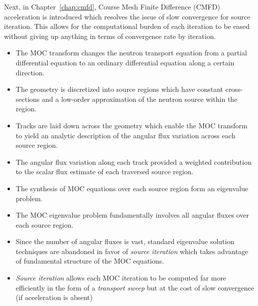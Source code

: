 Next, in Chapter~\ref{chap:cmfd}, Course Mesh Finite Difference (CMFD) acceleration is introduced which resolves the issue of slow convergence for source iteration. This allows for the computational burden of each iteration to be eased without giving up anything in terms of convergence rate by iteration.

\newpage
\vfill
\begin{highlightsbox}[frametitle=Highlights]
	\begin{itemize}
		\item The MOC transform changes the neutron transport equation from a partial differential equation to an ordinary differential equation along a certain direction.
		\item The geometry is discretized into source regions which have constant cross-sections and a low-order approximation of the neutron source within the region.
		\item Tracks are laid down across the geometry which enable the  MOC transform to yield an analytic description of the angular flux variation across each source region.
		\item The angular flux variation along each track provided a weighted contribution to the scalar flux estimate of each traversed source region.
		\item The synthesis of MOC equations over each source region form an eigenvalue problem.
		\item The MOC eigenvalue problem fundamentally involves all angular fluxes over each source region.
		\item Since the number of angular fluxes is vast, standard eigenvalue solution techniques are abandoned in favor of \textit{source iteration} which takes advantage of fundamental structure of the MOC equations.
		\item \textit{Source iteration} allows each MOC iteration to be computed far more efficiently in the form of a \textit{transport sweep} but at the cost of slow convergence (if acceleration is absent)
	\end{itemize}
\end{highlightsbox}




